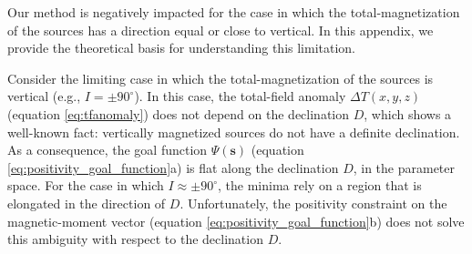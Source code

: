 \label{append:vertical-magnetization}

Our method is negatively impacted for the case in which the total-magnetization of the sources 
has a direction equal or close to vertical. In this appendix, we provide the theoretical basis for 
understanding this limitation.

Consider the limiting case in which the total-magnetization of the sources is vertical 
(e.g., $I = \pm 90^\circ$). In this case, the total-field anomaly $\Delta T(x, y, z)$ 
(equation \ref{eq:tfanomaly}) does not depend on the declination $D$, which shows a 
well-known fact: vertically magnetized sources do not have a definite declination.
As a consequence, the goal function $\Psi(\mathbf{s})$ (equation \ref{eq:positivity_goal_function}a) 
is flat along the declination $D$, in the parameter space.
For the case in which $I \approx \pm 90^\circ$, the minima rely on a region that is elongated 
in the direction of $D$. Unfortunately, the positivity constraint on the magnetic-moment
vector (equation \ref{eq:positivity_goal_function}b) does not solve this ambiguity with 
respect to the declination $D$.

